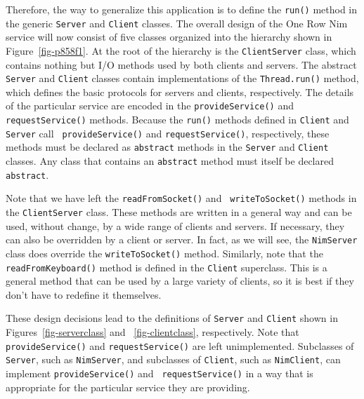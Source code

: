 Therefore, the way to generalize this application is to define the
{\tt run()} method in the generic {\tt Server} and {\tt Client}
classes. The overall design of the One Row Nim service will now consist of five classes
organized into the hierarchy shown in Figure~\ref{fig-p858f1}.  At
the root of the hierarchy is the {\tt ClientServer} class, which
contains nothing but I/O methods used by both clients and servers.
The abstract {\tt Server} and {\tt Client} classes contain
implementations of the {\tt Thread.run()} method, which defines the
basic protocols for servers and clients, respectively.   The details of the
particular service are encoded in the {\tt provideService()} and
{\tt requestService()} methods. Because the {\tt run()} methods defined 
in {\tt Client} and {\tt Server} call {\tt
provideService()} and {\tt requestService()}, respectively,  these
methods must be declared as {\tt abstract} methods in the {\tt Server}
and {\tt Client} classes.  Any class that contains an
\mbox{\tt abstract} method must itself be declared {\tt abstract}. 

Note that we have left the {\tt readFromSocket()} and {\tt
writeToSocket()} methods in the {\tt ClientServer} class. These
methods are written in a general way and can be used, without change,
by a wide range of clients and servers.  If necessary, they can also
be overridden by a client or server. In fact, as we will see, the
{\tt NimServer} class does override the {\tt writeToSocket()} method.
Similarly, note that the {\tt readFromKeyboard()} method is defined in
the {\tt Client} superclass.  This is a general method that
can be used by a large variety of clients, so it is best if they don't
have to redefine it themselves.

These design decisions lead to the definitions of {\tt Server} and
{\tt Client} shown in Figures~\ref{fig-serverclass} and
~\ref{fig-clientclass}, respectively. Note that {\tt provideService()}
and {\tt requestService()} are left unimplemented.  Subclasses of {\tt
Server}, such as {\tt NimServer}, and subclasses of {\tt Client}, such
as {\tt NimClient}, can implement {\tt provideService()} and {\tt
requestService()} in a way that is appropriate for the particular
service they are providing.


